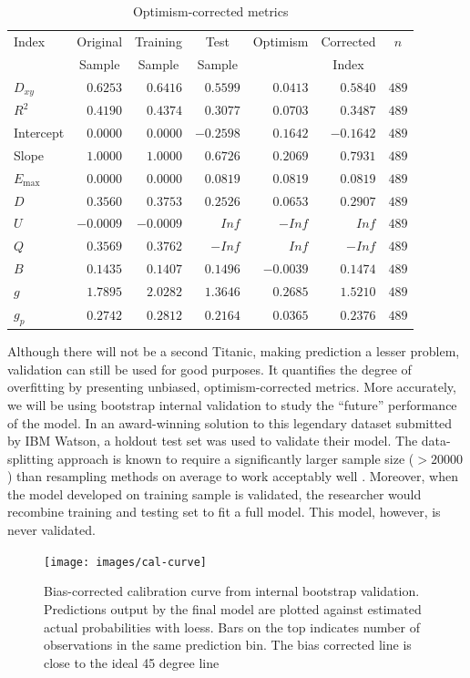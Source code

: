 \documentclass[]{interact}
\theoremstyle{plain}%
\theoremstyle{definition}
\theoremstyle{remark}
\begin{document}
\begin{table}[h]
\caption{Optimism-corrected metrics\label{model-val}} 
\begin{center}\small
\begin{tabular}{lrrrrrr}
\hline\hline
\multicolumn{1}{l}{Index}&\multicolumn{1}{c}{Original}&\multicolumn{1}{c}{Training}&\multicolumn{1}{c}{Test}&\multicolumn{1}{c}{Optimism}&\multicolumn{1}{c}{Corrected}&\multicolumn{1}{c}{$n$}\tabularnewline
&\multicolumn{1}{c}{{\small Sample}}&\multicolumn{1}{c}{{\small Sample}}&\multicolumn{1}{c}{{\small Sample}}&&\multicolumn{1}{c}{{\small Index}}&\tabularnewline
\hline
$D_{xy}$&$ 0.6253$&$ 0.6416$&$ 0.5599$&$ 0.0413$&$ 0.5840$&$489$\tabularnewline
$R^{2}$&$ 0.4190$&$ 0.4374$&$ 0.3077$&$ 0.0703$&$ 0.3487$&$489$\tabularnewline
Intercept&$ 0.0000$&$ 0.0000$&$-0.2598$&$ 0.1642$&$-0.1642$&$489$\tabularnewline
Slope&$ 1.0000$&$ 1.0000$&$ 0.6726$&$ 0.2069$&$ 0.7931$&$489$\tabularnewline
$E_{\max}$&$ 0.0000$&$ 0.0000$&$ 0.0819$&$ 0.0819$&$ 0.0819$&$489$\tabularnewline
$D$&$ 0.3560$&$ 0.3753$&$ 0.2526$&$ 0.0653$&$ 0.2907$&$489$\tabularnewline
$U$&$-0.0009$&$-0.0009$&$    Inf$&$   -Inf$&$    Inf$&$489$\tabularnewline
$Q$&$ 0.3569$&$ 0.3762$&$   -Inf$&$    Inf$&$   -Inf$&$489$\tabularnewline
$B$&$ 0.1435$&$ 0.1407$&$ 0.1496$&$-0.0039$&$ 0.1474$&$489$\tabularnewline
$g$&$ 1.7895$&$ 2.0282$&$ 1.3646$&$ 0.2685$&$ 1.5210$&$489$\tabularnewline
$g_{p}$&$ 0.2742$&$ 0.2812$&$ 0.2164$&$ 0.0365$&$ 0.2376$&$489$\tabularnewline
\hline
\end{tabular}
\end{center}
\end{table}

Although there will not be a second Titanic, making prediction a lesser problem, validation can still be used for good purposes. It quantifies the degree of overfitting by presenting unbiased, optimism-corrected metrics. More accurately, we will be using bootstrap internal validation to study the ``future'' performance of the model. In an award-winning solution to this legendary dataset submitted by IBM Watson, a holdout test set was used to validate their model. The data-splitting approach is known to require a significantly larger sample size (\(> 20000\)) than resampling methods on average to work acceptably well \citep{splitval}. Moreover, when the model developed on training sample is validated, the researcher would recombine training and testing set to fit a full model. This model, however, is never validated.

\begin{figure}

{\centering \texttt{[image: images/cal-curve]} 

}

\caption{Bias-corrected calibration curve from internal bootstrap validation. Predictions output by the final model are plotted against estimated actual probabilities with loess. Bars on the top indicates number of observations in the same prediction bin. The bias corrected line is close to the ideal 45 degree line}\label{fig:cal-curve}
\end{figure}
\end{document}
